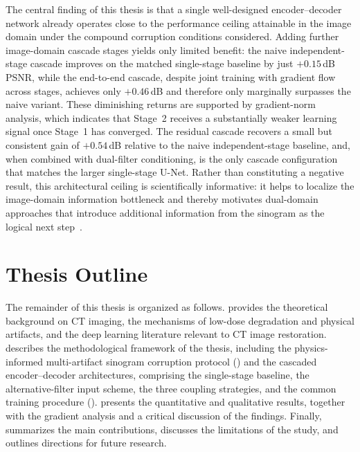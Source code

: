 The central finding of this thesis is that a single well-designed encoder--decoder network already operates close to the performance ceiling attainable in the image domain under the compound corruption conditions considered. Adding further image-domain cascade stages yields only limited benefit: the naive independent-stage cascade improves on the matched single-stage baseline by just \(+0.15\)\,dB PSNR, while the end-to-end cascade, despite joint training with gradient flow across stages, achieves only \(+0.46\)\,dB and therefore only marginally surpasses the naive variant. These diminishing returns are supported by gradient-norm analysis, which indicates that Stage~2 receives a substantially weaker learning signal once Stage~1 has converged. The residual cascade recovers a small but consistent gain of \(+0.54\)\,dB relative to the naive independent-stage baseline, and, when combined with dual-filter conditioning, is the only cascade configuration that matches the larger single-stage U-Net. Rather than constituting a negative result, this architectural ceiling is scientifically informative: it helps to localize the image-domain information bottleneck and thereby motivates dual-domain approaches that introduce additional information from the sinogram as the logical next step~\cite{Wang2020, Zhang2022}.

\section{Thesis Outline}
\label{sec:intro_outline}

The remainder of this thesis is organized as follows.  provides the theoretical background on CT imaging, the mechanisms of low-dose degradation and physical artifacts, and the deep learning literature relevant to CT image restoration.  describes the methodological framework of the thesis, including the physics-informed multi-artifact sinogram corruption protocol () and the cascaded encoder--decoder architectures, comprising the single-stage baseline, the alternative-filter input scheme, the three coupling strategies, and the common training procedure ().  presents the quantitative and qualitative results, together with the gradient analysis and a critical discussion of the findings. Finally,  summarizes the main contributions, discusses the limitations of the study, and outlines directions for future research.
